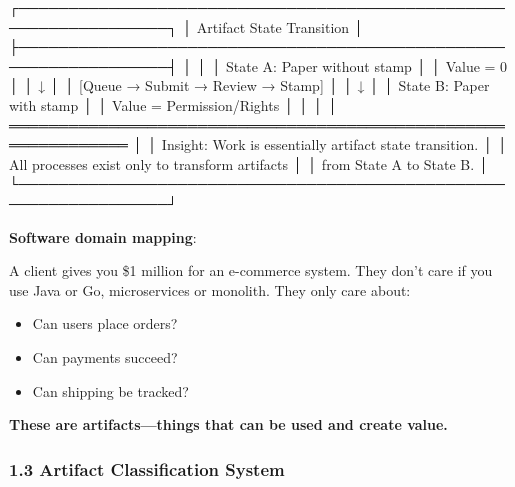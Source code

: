 \documentclass[
]{article}
\newenvironment{Shaded}{}{}
\newcommand{\NormalTok}[1]{#1}
\begin{document}
\begin{Shaded}
\begin{Highlighting}[]
\NormalTok{┌─────────────────────────────────────────────────────────────────┐}
\NormalTok{│                    Artifact State Transition                     │}
\NormalTok{├─────────────────────────────────────────────────────────────────┤}
\NormalTok{│                                                                  │}
\NormalTok{│  State A: Paper without stamp                                   │}
\NormalTok{│          Value = 0                                              │}
\NormalTok{│                    ↓                                             │}
\NormalTok{│          [Queue → Submit → Review → Stamp]                      │}
\NormalTok{│                    ↓                                             │}
\NormalTok{│  State B: Paper with stamp                                      │}
\NormalTok{│          Value = Permission/Rights                               │}
\NormalTok{│                                                                  │}
\NormalTok{│  ══════════════════════════════════════════════════════════════  │}
\NormalTok{│  Insight: Work is essentially artifact state transition.        │}
\NormalTok{│          All processes exist only to transform artifacts        │}
\NormalTok{│          from State A to State B.                               │}
\NormalTok{└─────────────────────────────────────────────────────────────────┘}
\end{Highlighting}
\end{Shaded}

\textbf{Software domain mapping}:

A client gives you \$1 million for an e-commerce system. They don't care
if you use Java or Go, microservices or monolith. They only care about:

\begin{itemize}
\item
  Can users place orders?
\item
  Can payments succeed?
\item
  Can shipping be tracked?
\end{itemize}

\textbf{These are artifacts---things that can be used and create value.}

\hypertarget{13-artifact-classification-system}{%
\subsubsection{1.3 Artifact Classification
System}\label{13-artifact-classification-system}}
\end{document}
